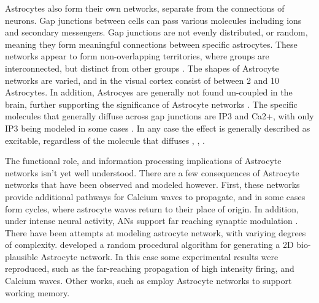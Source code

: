     Astrocytes also form their own networks, separate from the connections of
    neurons. Gap junctions between cells can pass various molecules including
    ions and secondary messengers. Gap junctions are not evenly distributed, or
    random, meaning they form meaningful connections between specific
    astrocytes. These networks appear to form non-overlapping territories, where
    groups are interconnected, but distinct from other
    groups \cite{mederos_2018}. The shapes of Astrocyte networks are varied,
    and in the visual cortex consist of between 2 and 10 Astrocytes. In
    addition, Astrocyes are generally not found un-coupled in the brain, further
    supporting the significance of Astrocyte networks \cite{postnov_2009}. The
    specific molecules that generally diffuse across gap junctions are IP3 and
    Ca2+, with only IP3 being modeled in some cases \cite{pitta_2012}. In any
    case the effect is generally described as excitable, regardless of the
    molecule that diffuses \cite{gordleeva_2021}, \cite{pitta_2012},
    \cite{postnov_2009}.
    
    The functional role, and information processing implications of Astrocyte
    networks isn't yet well understood. There are a few consequences of
    Astrocyte networks that have been observed and modeled however. First, these
    networks provide additional pathways for Calcium waves to propagate, and in
    some cases form cycles, where astrocyte waves return to their place of
    origin. In addition, under intense neural activity, ANs support far reaching
    synaptic modulation \cite{postnov_2009}. There have been attempts at
    modeling astrocyte network, with variying degrees of
    complexity. \cite{postnov_2009} developed a random procedural algorithm for
    generating a 2D bio-plausible Astrocyte network. In this case some
    experimental results were reproduced, such as the far-reaching propagation
    of high intensity firing, and Calcium waves. Other works, such as
    \cite{gordleeva_2021} employ Astrocyte networks to support working memory.

    
    
    

